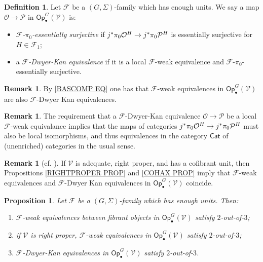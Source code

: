\documentclass[a4paper,10pt
,draft
]{article}%
\numberwithin{equation}{section}
\numberwithin{figure}{section}
\newtheorem{proposition}[equation]{Proposition}%
\theoremstyle{definition} %
\newtheorem{definition}[equation]{Definition}%
\newtheorem{remark}[equation]{Remark}%
\newcommand{\Op}{\mathsf{Op}}%
\newcommand{\F}{\ensuremath{\mathcal F}}
\newcommand{\V}{\ensuremath{\mathcal V}}
\renewcommand{\O}{\ensuremath{\mathcal O}}
\renewcommand{\P}{\ensuremath{\mathcal P}}
\newcommand{\1}{\ensuremath{\mathbbm 1}}%
\begin{document}
\begin{definition}\label{DKEQUIV_DEF}
Let $\F$ be a $(G,\Sigma)$-family which has enough units.
We say a map $\O \to \P$ in $\Op^G_\bullet(\V)$ is:
\begin{itemize}
\item \textit{$\F$-$\pi_0$-essentially surjective} if
	$j^{\**}\pi_0 \O^H \to j^{\**}\pi_0 \P^H$
	is essentially surjective for $H \in \F_1$;
\item a \textit{$\F$-Dwyer-Kan equivalence} if
	it is a local $\F$-weak equivalence and $\F$-$\pi_0$-essentially
	surjective.
\end{itemize}
\end{definition}


\begin{remark}\label{FEWFDK REM}
By \eqref{BASCOMP EQ}
one has that $\F$-weak equivalences in $\mathsf{Op}^G_\bullet(\V)$
are also $\F$-Dwyer Kan equivalences.
\end{remark}


\begin{remark}\label{CATEQUIV REM}
The requirement that 
a $\F$-Dwyer-Kan equivalence $\O \to \P$
be a local $\F$-weak equivalance
implies that the maps of categories 
$j^{\**}\pi_0 \O^H \to j^{\**}\pi_0 \P^H$
must also be local isomorphisms, 
and thus equivalences in the category $\mathsf{Cat}$
of (unenriched) categories in the usual sense.
\end{remark}




\begin{remark}[{cf. \cite[Prop. 2.20]{BM13}}]
If $\V$ is adequate, right proper, and has a cofibrant unit,
then Propositions \ref{RIGHTPROPER PROP} and \ref{COHAX PROP}
imply that $\F$-weak equivalences and $\F$-Dwyer Kan equivalences
in $\mathsf{Op}^G_\bullet(\V)$ coincide.
\end{remark}






\begin{proposition}\label{2OUTOF3 PROP}
Let $\F$ be a $(G,\Sigma)$-family which has enough units. 
Then:
\begin{enumerate}[label=(\roman*)]
\item $\F$-weak equivalences between fibrant objects in $\mathsf{Op}^G_\bullet(\V)$
satisfy $2$-out-of-$3$;
\item if $\V$ is right proper, $\F$-weak equivalences in $\mathsf{Op}^G_\bullet(\V)$
satisfy $2$-out-of-$3$;
\item $\F$-Dwyer-Kan equivalences in $\mathsf{Op}^G_\bullet(\V)$
satisfy $2$-out-of-$3$.
\end{enumerate}
\end{proposition}
\end{document}

